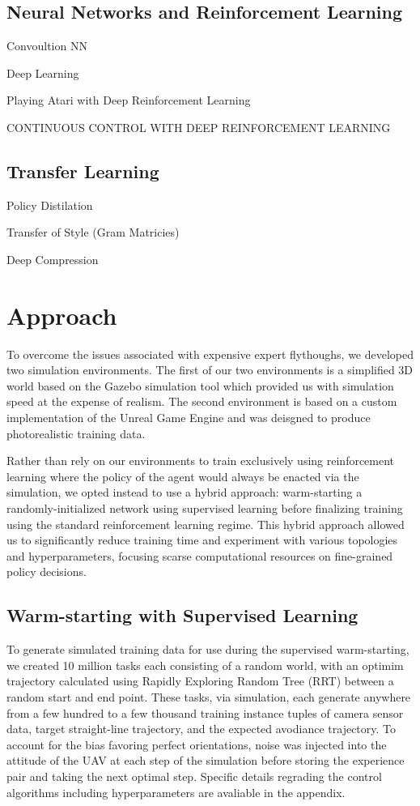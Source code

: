 \documentclass[paper=a4, fontsize=11pt]{scrartcl} %
\begin{document}
	\subsection{Neural Networks and Reinforcement Learning}
		Convoultion NN

		Deep Learning \cite{LeCun2015}

		Playing Atari with Deep Reinforcement Learning~\cite{Mnih2013}

		CONTINUOUS CONTROL WITH DEEP REINFORCEMENT LEARNING~\cite{Lillicrap2015}

	\subsection{Transfer Learning}
		Policy Distilation~\cite{Rusu2015}

		Transfer of Style (Gram Matricies)~\cite{Gatys2015}
		
		Deep Compression~\cite{Han2015}


\section{Approach} 

	To overcome the issues associated with expensive expert flythoughs, we developed two simulation environments. The first of our two environments is a simplified 3D world based on
	the Gazebo simulation tool which provided us with simulation speed at the expense of realism. The second environment is based on a custom implementation of the Unreal Game Engine and was deisgned to produce photorealistic training data.

	Rather than rely on our environments to train exclusively using reinforcement learning where the policy of the agent would always be enacted via the simulation, we opted instead to use a hybrid approach: warm-starting a randomly-initialized network using supervised learning before finalizing training using the standard reinforcement learning regime. This hybrid approach allowed us to significantly reduce training time and experiment with various topologies and hyperparameters, focusing scarse computational resources on fine-grained policy decisions.

	\subsection{Warm-starting with Supervised Learning} 
	To generate simulated training data for use during the supervised warm-starting, we created 10 million tasks each consisting of a random world, with an optimim trajectory calculated using Rapidly Exploring Random Tree (RRT) between a random start and end point. These tasks, via simulation, each generate anywhere from a few hundred to a few thousand training instance tuples of camera sensor data, target straight-line trajectory, and the expected avodiance trajectory. To account for the bias favoring perfect orientations, noise was injected into the attitude of the UAV at each step of the simulation before storing the experience pair and taking the next optimal step. Specific details regrading the control algorithms including hyperparameters are avaliable in the appendix.
\end{document}
